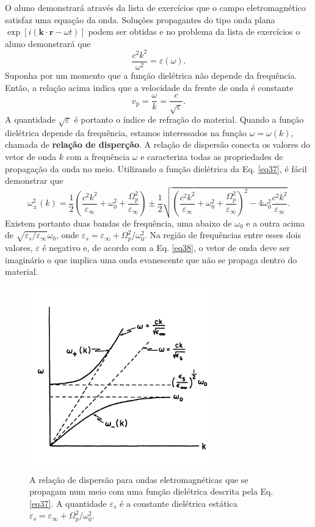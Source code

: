 \documentclass{article}
\begin{document}
O aluno demonstrará através da lista de exercícios que o campo eletromagnético satisfaz uma equação da onda. Soluções propagantes do tipo onda plana $\exp[i(\mathbf{k}\cdot\mathbf{r}-\omega t)]$ podem ser obtidas e no problema da lista de exercícios o aluno demonstrará que
\begin{equation}
    \frac{c^2 k^2}{\omega^2} = \varepsilon(\omega).
    \label{eq38}
\end{equation}
Suponha por um momento que a função dielétrica não depende da frequência. Então, a relação acima indica que a velocidade da frente de onda é constante
\begin{equation}
    v_{\text{p}} = \frac{\omega}{k} = \frac{c}{\sqrt{\varepsilon}}.
\end{equation}
A quantidade $\sqrt{\varepsilon}$ é portanto o índice de refração do material. Quando a função dielétrica depende da frequência, estamos interessados na função $\omega = \omega(k)$, chamada de \textbf{relação de disperção}. A relação de dispersão conecta os valores do vetor de onda $k$ com a frequência $\omega$ e caracteriza todas as propriedades de propagação da onda no meio. Utilizando a função dielétrica da Eq. \eqref{eq37}, é fácil demonstrar que
\begin{equation}
    \omega^{2}_{\pm}(k) = \frac{1}{2}\left( \frac{c^2 k^2}{\varepsilon_\infty} + \omega_0^2 + \frac{\Omega_p^2}{\varepsilon_\infty} \right) \pm \frac{1}{2}\sqrt{\left( \frac{c^2 k^2}{\varepsilon_\infty } + \omega_0^2 + \frac{\Omega_p^2}{\varepsilon_\infty} \right)^{2} - 4\omega_0^2 \frac{c^2 k^2}{\varepsilon_\infty}}.
\end{equation}
Existem portanto duas bandas de frequência, uma abaixo de $\omega_0$ e a outra acima de $\sqrt{\varepsilon_s/\varepsilon_\infty}\omega_0$, onde $\varepsilon_s = \varepsilon_\infty + \Omega_p^2 /\omega_0^2$. Na região de frequências entre esses dois valores, $\varepsilon$ é negativo e, de acordo com a Eq. \eqref{eq38}, o vetor de onda deve ser imaginário o que implica uma onda evanescente que não se propaga dentro do material.

\begin{figure}[ht]
\centering
\includegraphics[width=8cm]{fig3.pdf}
\caption{A relação de dispersão para ondas eletromagnéticas que se propagam num meio com uma função dielétrica descrita pela Eq. \eqref{eq37}. A quantidade $\varepsilon_s$ é a constante dielétrica estática $\varepsilon_s = \varepsilon_\infty + \Omega_p^2 /\omega_0^2$.}
\end{figure}
\end{document}
